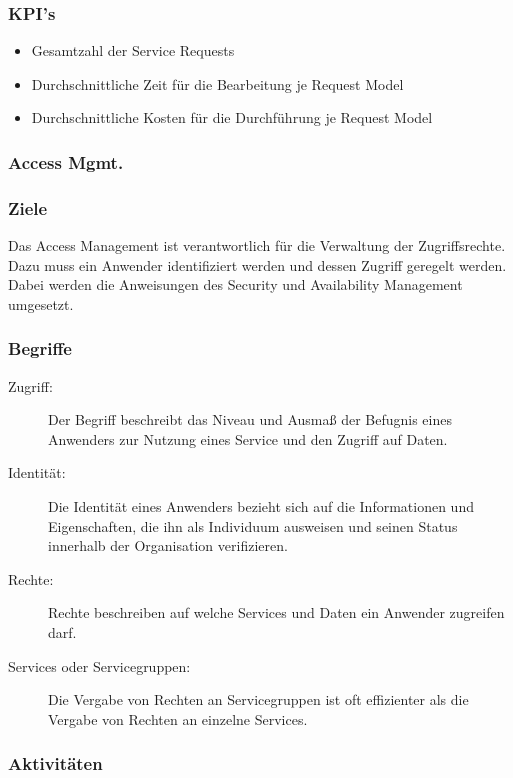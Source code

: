 \subsubsection{KPI's}

\begin{itemize}
	\item Gesamtzahl der Service Requests
	\item Durchschnittliche Zeit für die Bearbeitung je Request Model
	\item Durchschnittliche Kosten für die Durchführung je Request Model
\end{itemize}

\subsubsection{Access Mgmt.}

\subsubsection{Ziele}

Das Access Management ist verantwortlich für die Verwaltung der Zugriffsrechte. Dazu muss ein Anwender identifiziert werden und dessen Zugriff geregelt werden. Dabei werden die Anweisungen des Security und Availability Management umgesetzt.

\subsubsection{Begriffe}

\begin{description}
	\item[Zugriff:] Der Begriff beschreibt das Niveau und Ausmaß der Befugnis eines Anwenders zur Nutzung eines Service und den Zugriff auf Daten.
	\item[Identität:] Die Identität eines Anwenders bezieht sich auf die Informationen und Eigenschaften, die ihn als Individuum ausweisen und seinen Status innerhalb der Organisation verifizieren.
	\item[Rechte:] Rechte beschreiben auf welche Services und Daten ein Anwender zugreifen darf.
	\item[Services oder Servicegruppen:] Die Vergabe von Rechten an Servicegruppen ist oft effizienter als die Vergabe von Rechten an einzelne Services.
\end{description}

\subsubsection{Aktivitäten}


